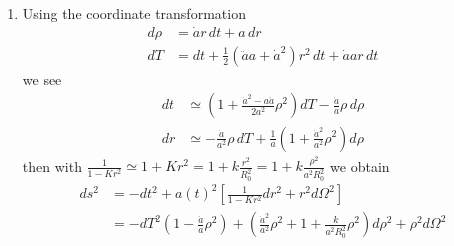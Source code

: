 \documentclass[10pt,a4paper]{article}
\theoremstyle{definition}
\begin{document}
\begin{enumerate}
\item Using the coordinate transformation
\begin{align}
d\rho&=\dot{a}r\,dt+a\,dr\\
dT&=dt+\frac{1}{2}(\ddot{a}a+\dot{a}^2)r^2\,dt+\dot{a}ar\,dt
\end{align}
we see
\begin{align}
dt&\simeq \left(1+\frac{\dot{a}^2-a\ddot{a}}{2a^2}\rho^2\right)dT-\frac{\dot{a}}{a}\rho\,d\rho\\
dr&\simeq-\frac{\dot{a}}{a^2}\rho\,dT+\frac{1}{a}\left(1+\frac{\dot{a}^2}{a^2}\rho^2\right)d\rho
\end{align}
then with $\frac{1}{1-Kr^2}\simeq 1+Kr^2=1+k\frac{r^2}{R_0^2}=1+k\frac{\rho^2}{a^2R_0^2}$ we obtain
\begin{align}
ds^2
&=-dt^2+a(t)^2\left[\frac{1}{1-Kr^2} dr^2+r^2d\Omega^2\right]\\
&=-dT^2\left(1-\frac{\ddot{a}}{a}\rho^2\right)+\left(\frac{\dot{a}^2}{a^2}\rho^2+1+\frac{k}{a^2R_0^2}\rho^2\right) d\rho^2+\rho^2d\Omega^2
\end{align}
\end{enumerate}
\end{document}
